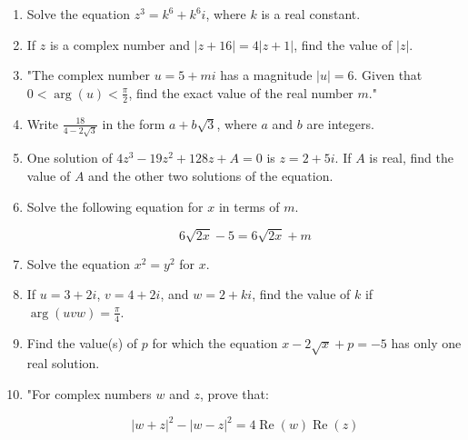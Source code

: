 \documentclass{article}
\begin{document}
\begin{enumerate}
\vspace{3cm}
\item Solve the equation \( z^3 = k^6 + k^6 i \), where \( k \) is a real constant.
\vspace{3cm}
\item If \( z \) is a complex number and \( |z + 16| = 4|z + 1| \), find the value of \( |z| \).
\vspace{3cm}
\item "The complex number \( u = 5 + mi \) has a magnitude \( |u| = 6 \). Given that \( 0 < \arg(u) < \frac{\pi}{2} \), find the exact value of the real number \( m \)."
\vspace{3cm}
\item Write \( \frac{18}{4 - 2\sqrt{3}} \) in the form \( a + b\sqrt{3} \), where \( a \) and \( b\) are integers.
\vspace{3cm}
\item One solution of \(4z^3 - 19z^2 + 128z + A = 0\) is \(z = 2 + 5i\). If \(A\) is real, find the value of \(A\) and the other two solutions of the equation.
\vspace{3cm}
\item Solve the following equation for \(x\) in terms of \(m\).

\[6\sqrt{2x} - 5 = 6\sqrt{2x} + m\]
\vspace{3cm}
\item Solve the equation \( x^2 = y^2 \) for \( x \).
\vspace{3cm}
\item If \( u = 3 + 2i \), \( v = 4 + 2i \), and \( w = 2 + ki \), find the value of \( k \) if \(\arg(uvw) = \frac{\pi}{4}\).
\vspace{3cm}
\item Find the value(s) of \( p \) for which the equation \( x - 2\sqrt{x} + p = -5 \) has only one real solution.
\vspace{3cm}
\item "For complex numbers \( w \) and \( z \), prove that:

\[
|w + z|^2 - |w - z|^2 = 4 \operatorname{Re}(w) \operatorname{Re}(z)
\]


\end{enumerate}
\end{document}
